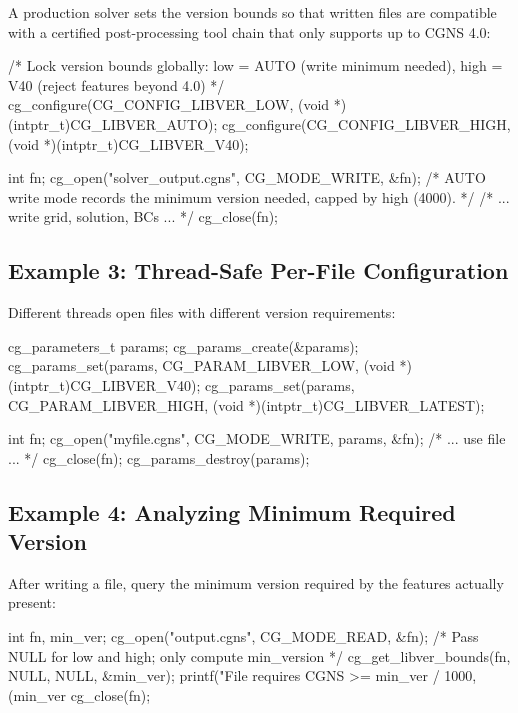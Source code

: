 \documentclass[11pt,letterpaper]{article}
\makeatletter
\let\cgns@orig@lstlisting\lstlisting
\let\cgns@endorig@lstlisting\endlstlisting
\renewenvironment{lstlisting}
  {\par\needspace{5\baselineskip}\nolinenumbers\cgns@orig@lstlisting}
  {\cgns@endorig@lstlisting\par\linenumbers}
\makeatother
\begin{document}
A production solver sets the version bounds so that written files are
compatible with a certified post-processing tool chain that only
supports up to CGNS 4.0:

\begin{lstlisting}[language=C]
/* Lock version bounds globally:
   low  = AUTO (write minimum needed),
   high = V40  (reject features beyond 4.0) */
cg_configure(CG_CONFIG_LIBVER_LOW,  (void *)(intptr_t)CG_LIBVER_AUTO);
cg_configure(CG_CONFIG_LIBVER_HIGH, (void *)(intptr_t)CG_LIBVER_V40);

int fn;
cg_open("solver_output.cgns", CG_MODE_WRITE, &fn);
/* AUTO write mode records the minimum version needed,
   capped by high (4000). */
/* ... write grid, solution, BCs ... */
cg_close(fn);
\end{lstlisting}

\subsection{Example 3: Thread-Safe Per-File Configuration}

Different threads open files with different version requirements:

\begin{lstlisting}[language=C]
cg_parameters_t params;
cg_params_create(&params);
cg_params_set(params, CG_PARAM_LIBVER_LOW,
              (void *)(intptr_t)CG_LIBVER_V40);
cg_params_set(params, CG_PARAM_LIBVER_HIGH,
              (void *)(intptr_t)CG_LIBVER_LATEST);

int fn;
cg_open("myfile.cgns", CG_MODE_WRITE, params, &fn);
/* ... use file ... */
cg_close(fn);
cg_params_destroy(params);
\end{lstlisting}

\subsection{Example 4: Analyzing Minimum Required Version}

After writing a file, query the minimum version required by the
features actually present:

\begin{lstlisting}[language=C]
int fn, min_ver;
cg_open("output.cgns", CG_MODE_READ, &fn);
/* Pass NULL for low and high; only compute min_version */
cg_get_libver_bounds(fn, NULL, NULL, &min_ver);
printf("File requires CGNS >= %d.%d\n",
       min_ver / 1000, (min_ver % 1000) / 10);
cg_close(fn);
\end{lstlisting}
\end{document}
